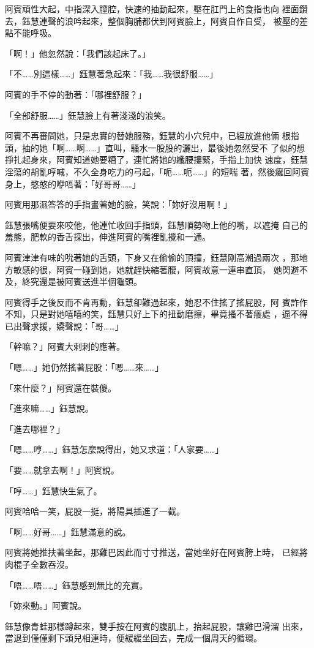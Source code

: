 阿賓頑性大起，中指深入膣腔，快速的抽動起來，壓在肛門上的食指也向
裡面鑽去，鈺慧連聲的浪吟起來，整個胸脯都伏到阿賓臉上，阿賓自作自受，
被壓的差點不能呼吸。

「啊！」他忽然說：「我們該起床了。」

「不……別這樣……」鈺慧著急起來：「我……我很舒服……」

阿賓的手不停的動著：「哪裡舒服？」

「全部舒服……」鈺慧臉上有著淺淺的浪笑。

阿賓不再審問她，只是忠實的替她服務，鈺慧的小穴兒中，已經放進他倆
根指頭，抽的她「啊……啊……」直叫，騷水一股股的灑出，最後她忽然受不
了似的想掙扎起身來，阿賓知道她要糟了，連忙將她的纖腰摟緊，手指上加快
速度，鈺慧淫蕩的胡亂哼喊，不久全身吃力的弓起，「呃……呃……」的短喘
著，然後癱回阿賓身上，憨憨的咿唔著：「好哥哥……」

阿賓用那濕答答的手指畫著她的臉，笑說：「妳好沒用啊！」

鈺慧張嘴便要來咬他，他連忙收回手指頭，鈺慧順勢吻上他的嘴，以遮掩
自己的羞態，肥軟的香舌探出，伸進阿賓的嘴裡亂攪和一通。

阿賓津津有味的吮著她的舌頭，下身又在偷偷的頂撞，鈺慧剛高潮過兩次
，那地方敏感的很，阿賓一碰到她，她就趕快縮著腰，阿賓故意一連串直頂，
她閃避不及，終究還是被阿賓送進半個龜頭。

阿賓得手之後反而不肯再動，鈺慧卻難過起來，她忍不住搖了搖屁股，阿
賓詐作不知，只是對她嘻嘻的笑，鈺慧只好上下的扭動磨擦，畢竟搔不著癢處
，逼不得已出聲求援，嬌聲說：「哥……」

「幹嘛？」阿賓大剌剌的應著。

「嗯……」她仍然搖著屁股：「嗯……來……」

「來什麼？」阿賓還在裝傻。

「進來嘛……」鈺慧說。

「進去哪裡？」

「嗯……哼……」鈺慧怎麼說得出，她又求道：「人家要……」

「要……就拿去啊！」阿賓說。

「哼……」鈺慧快生氣了。

阿賓哈哈一笑，屁股一挺，將陽具插進了一截。

「啊……好哥……」鈺慧滿意的說。

阿賓將她推扶著坐起，那雞巴因此而寸寸推送，當她坐好在阿賓胯上時，
已經將肉棍子全數吞沒。

「唔……唔……」鈺慧感到無比的充實。

「妳來動。」阿賓說。

鈺慧像青蛙那樣蹲起來，雙手按在阿賓的腹肌上，抬起屁股，讓雞巴滑溜
出來，當退到僅僅剩下頭兒相連時，便緩緩坐回去，完成一個周天的循環。

